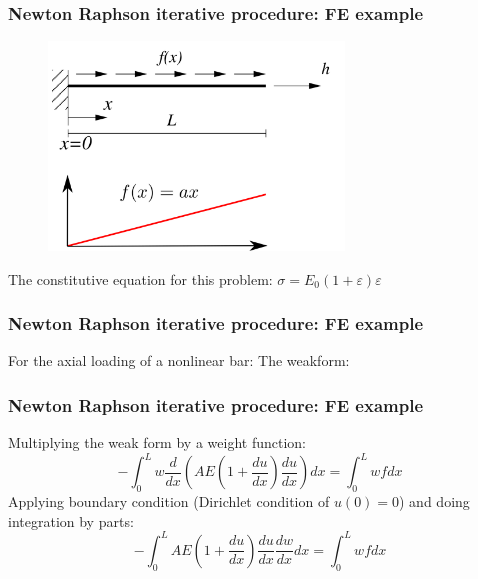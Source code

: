 \documentclass[notes]{beamer}
\begin{document}
\begin{frame}
\frametitle{Newton Raphson iterative procedure: FE example}
\begin{figure}[ht]
	\centering
	\includegraphics[width=0.7\textwidth]{figs/strong-form-nonlinear.png}
\end{figure}
The constitutive equation for this problem: $\sigma = E_0 (1 + \varepsilon)\varepsilon$
\end{frame}

\begin{frame}
\frametitle{Newton Raphson iterative procedure: FE example}
For the axial loading of a nonlinear bar:
The weakform:
\end{frame}

\begin{frame}
\frametitle{Newton Raphson iterative procedure: FE example}
Multiplying the weak form by a weight function:
	\begin{equation*}
		-\int_0^L w \frac{d}{dx}\left(AE\left(1 + \frac{du}{dx}\right)\frac{du}{dx}\right) dx = \int_0^L wf dx
	\end{equation*}
Applying boundary condition (Dirichlet condition of $u(0) = 0$) and doing integration by parts:	
	\begin{equation*}
		-\int_0^L AE\left(1 + \frac{du}{dx}\right)\frac{du}{dx} \frac{dw}{dx} dx = \int_0^L wf dx
	\end{equation*}
\end{frame}
\end{document}
